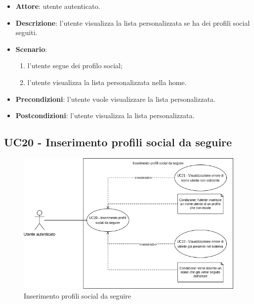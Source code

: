 \begin{itemize}
    \item \textbf{Attore}: utente autenticato.
    \item \textbf{Descrizione}: l'utente visualizza la lista personalizzata se ha dei profili social seguiti.
    \item \textbf{Scenario}:
    \begin{enumerate}
        \item l'utente segue dei profilo social;
        \item l'utente visualizza la lista personalizzata nella home.
    \end{enumerate}

    \item \textbf{Precondizioni}: l'utente vuole visualizzare la lista personalizzata.
    \item \textbf{Postcondizioni}: l'utente visualizza la lista personalizzata.
\end{itemize}

\subsection{UC20 - Inserimento profili social da seguire}
\begin{figure}[H]
    \includegraphics[width=15cm]{sezioni/Images/UC20.png}
    \centering
    \caption{Inserimento profili social da seguire}
\end{figure}

